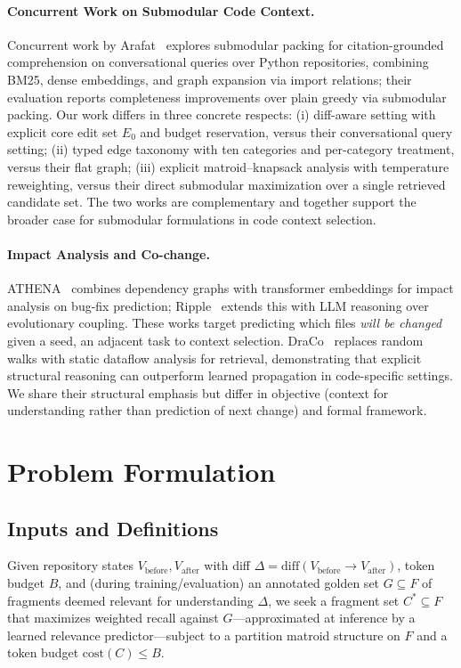 \documentclass[11pt, a4paper]{article}
\begin{document}
\paragraph{Concurrent Work on Submodular Code Context.}
Concurrent work by Arafat~\cite{arafat2025citation} explores submodular packing for citation-grounded comprehension on conversational queries over Python repositories, combining BM25, dense embeddings, and graph expansion via import relations; their evaluation reports completeness improvements over plain greedy via submodular packing. Our work differs in three concrete respects: (i) diff-aware setting with explicit core edit set $E_0$ and budget reservation, versus their conversational query setting; (ii) typed edge taxonomy with ten categories and per-category treatment, versus their flat graph; (iii) explicit matroid--knapsack analysis with temperature reweighting, versus their direct submodular maximization over a single retrieved candidate set. The two works are complementary and together support the broader case for submodular formulations in code context selection.

\paragraph{Impact Analysis and Co-change.}
ATHENA~\cite{athena2024} combines dependency graphs with transformer embeddings for impact analysis on bug-fix prediction; Ripple~\cite{ripple2026} extends this with LLM reasoning over evolutionary coupling. These works target predicting which files \emph{will be changed} given a seed, an adjacent task to context selection. DraCo~\cite{draco2024} replaces random walks with static dataflow analysis for retrieval, demonstrating that explicit structural reasoning can outperform learned propagation in code-specific settings. We share their structural emphasis but differ in objective (context for understanding rather than prediction of next change) and formal framework.

\newpage
\section{Problem Formulation}
\label{sec:problem}

\subsection{Inputs and Definitions}

Given repository states $V_{\mathrm{before}}, V_{\mathrm{after}}$ with diff $\Delta = \mathrm{diff}(V_{\mathrm{before}} \to V_{\mathrm{after}})$, token budget $B$, and (during training/evaluation) an annotated golden set $G \subseteq F$ of fragments deemed relevant for understanding $\Delta$, we seek a fragment set $C^* \subseteq F$ that maximizes weighted recall against $G$---approximated at inference by a learned relevance predictor---subject to a partition matroid structure on $F$ and a token budget $\mathrm{cost}(C) \leq B$.
\end{document}
